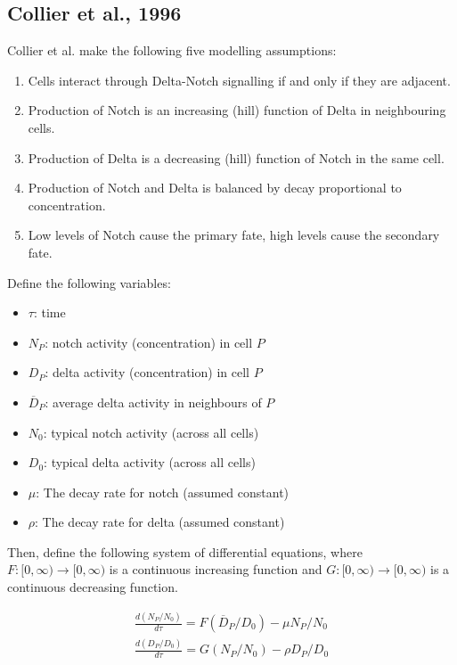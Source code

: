 \documentclass{article}
\begin{document}
\begin{flushleft}

\section{Collier et al., 1996}

Collier et al. make the following five modelling assumptions:
\begin{enumerate}
  \item Cells interact through Delta-Notch signalling if and only if they are adjacent.
  \item Production of Notch is an increasing (hill) function of Delta in neighbouring cells.
  \item Production of Delta is a decreasing (hill) function of Notch in the same cell.
  \item Production of Notch and Delta is balanced by decay proportional to concentration.
  \item Low levels of Notch cause the primary fate, high levels cause the secondary fate.
\end{enumerate}

Define the following variables:

\begin{itemize}
  \item $\tau$: time
  \item $N_{P}$: notch activity (concentration) in cell $P$
  \item $D_{P}$: delta activity (concentration) in cell $P$
  \item $\overline{D}_{P}$: average delta activity in neighbours of $P$
  \item $N_{0}$: typical notch activity (across all cells)
  \item $D_{0}$: typical delta activity (across all cells)
  \item $\mu$: The decay rate for notch (assumed constant)
  \item $\rho$: The decay rate for delta (assumed constant)
\end{itemize}

Then, define the following system of differential equations, where $F:[0, \infty) \rightarrow [0, \infty)$ is a continuous increasing function and $G: [0, \infty)\rightarrow [0, \infty)$ is a continuous decreasing function.

$$
\begin{aligned}
  \frac{d(N_{P} / N_{0})}{d\tau} = F(\overline{D}_{P} / D_{0}) - \mu N_{P} / N_{0} \\[5pt]
  \frac{d(D_{P} / D_{0})}{d\tau} = G(N_{P} / N_{0}) - \rho D_{P} / D_{0}
\end{aligned}
$$


\end{flushleft}
\end{document}
